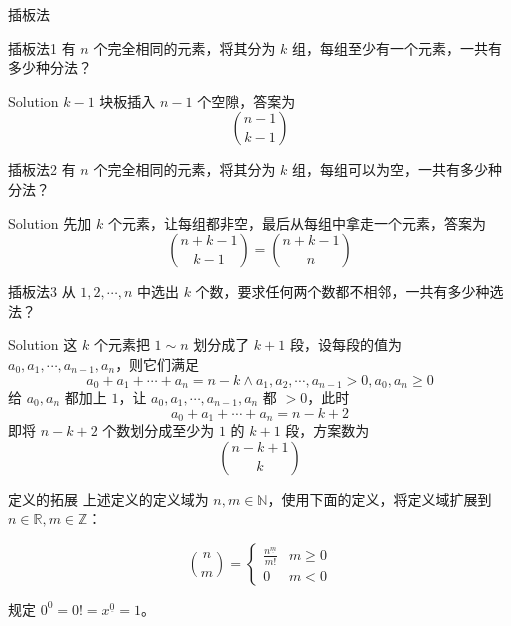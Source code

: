 \documentclass[UTF8]{beamer}
\begin{document}
    \begin{frame}{插板法}
        \begin{block}{插板法1}
            有 $n$ 个完全相同的元素，将其分为 $k$ 组，每组至少有一个元素，一共有多少种分法？
        \end{block}
        \pause
        \vspace{-0.7em}
        \begin{block}{Solution}
            $k-1$ 块板插入 $n-1$ 个空隙，答案为
            \vspace{-1em}
            $$
            \binom{n-1}{k-1}
            $$
            \vspace{-1em}
        \end{block}
        
        \pause
        \begin{block}{插板法2}
            有 $n$ 个完全相同的元素，将其分为 $k$ 组，每组可以为空，一共有多少种分法？
        \end{block}
        \pause
        \vspace{-0.7em}
        \begin{block}{Solution}
            先加 $k$ 个元素，让每组都非空，最后从每组中拿走一个元素，答案为
            \vspace{-0.5em}
            $$
            \binom{n+k-1}{k-1}=\binom{n+k-1}{n}
            $$
            \vspace{-1em}
        \end{block}
    \end{frame}
    \begin{frame}
        \begin{block}{插板法3}
            从 $1,2,\cdots,n$ 中选出 $k$ 个数，要求任何两个数都不相邻，一共有多少种选法？
        \end{block}
        \pause
        \begin{block}{Solution}
            这 $k$ 个元素把 $1\sim n$ 划分成了 $k+1$ 段，设每段的值为 $a_0,a_1,\cdots,a_{n-1},a_n$，则它们满足
            $$
            a_0+a_1+\cdots+a_n=n-k\land a_1,a_2,\cdots,a_{n-1}>0,a_0,a_{n}\ge 0
            $$
            给 $a_0,a_n$ 都加上 $1$，让 $a_0,a_1,\cdots,a_{n-1},a_n$ 都 $>0$，此时
            $$
            a_0+a_1+\cdots+a_n=n-k+2
            $$
            即将 $n-k+2$ 个数划分成至少为 $1$ 的 $k+1$ 段，方案数为
            $$
            \binom{n-k+1}{k}
            $$
        \end{block}
    \end{frame}

    \begin{frame}{定义的拓展}
        上述定义的定义域为 $n,m\in \mathbb N$，使用下面的定义，将定义域扩展到 $n\in \mathbb R,m\in \mathbb Z$：

        $$
        \binom nm = \begin{cases}
            \frac{n^{\underline m}}{m!} & m\ge 0\\
            0& m<0
        \end{cases}
        $$

        规定 $0^0=0!=x^{\underline 0}= 1$。
    \end{frame}
\end{document}
